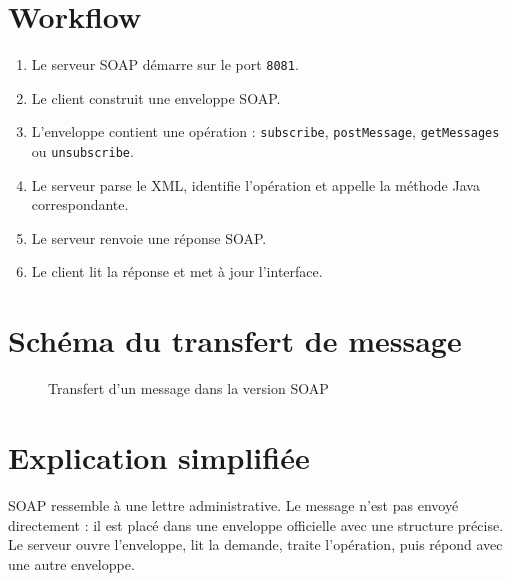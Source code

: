 \documentclass[12pt,a4paper]{report}
\begin{document}
\section{Workflow}

\begin{enumerate}
    \item Le serveur SOAP démarre sur le port \texttt{8081}.
    \item Le client construit une enveloppe SOAP.
    \item L'enveloppe contient une opération : \texttt{subscribe}, \texttt{postMessage}, \texttt{getMessages} ou \texttt{unsubscribe}.
    \item Le serveur parse le XML, identifie l'opération et appelle la méthode Java correspondante.
    \item Le serveur renvoie une réponse SOAP.
    \item Le client lit la réponse et met à jour l'interface.
\end{enumerate}

\section{Schéma du transfert de message}

\begin{figure}[H]
\centering
{}
\caption{Transfert d'un message dans la version SOAP}
\end{figure}

\section{Explication simplifiée}

SOAP ressemble à une lettre administrative. Le message n'est pas envoyé directement : il est placé dans une enveloppe officielle avec une structure précise. Le serveur ouvre l'enveloppe, lit la demande, traite l'opération, puis répond avec une autre enveloppe.
\end{document}

